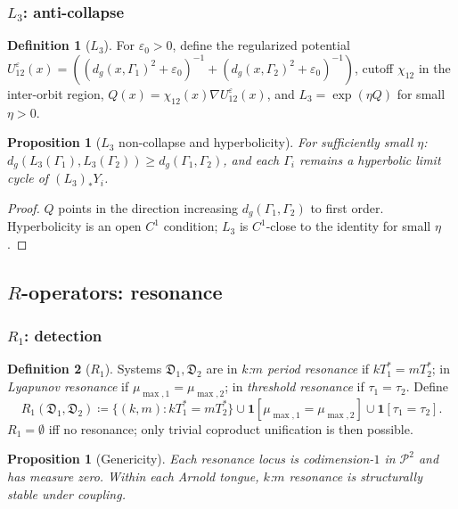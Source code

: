\documentclass[12pt, oneside]{book}
\theoremstyle{plain}
\newtheorem{proposition}[theorem]{Proposition}
\theoremstyle{definition}
\newtheorem{definition}{Definition}[section]
\theoremstyle{remark}
\newcommand{\dm}{\mathfrak{D}}
\newcommand{\Orb}{\Gamma}
\newcommand{\cP}{\mathcal{P}}
\newcommand{\eps}{\varepsilon}
\newcommand{\dg}{d_g}
\begin{document}
\subsubsection{\texorpdfstring{$L_3$}{L3}: anti-collapse}

\begin{definition}[$L_3$]\label{def:L3}
For $\eps_0>0$, define the regularized potential
$U_{12}^\eps(x)=((\dg(x,\Orb_1)^2+\eps_0)^{-1}+(\dg(x,\Orb_2)^2+\eps_0)^{-1})$,
cutoff $\chi_{12}$ in the inter-orbit region,
$Q(x)=\chi_{12}(x)\nabla U_{12}^\eps(x)$,
and $L_3=\exp(\eta Q)$ for small $\eta>0$.
\end{definition}

\begin{proposition}[$L_3$ non-collapse and hyperbolicity]\label{prop:L3}
For sufficiently small $\eta$:
$\dg(L_3(\Orb_1),L_3(\Orb_2))\ge\dg(\Orb_1,\Orb_2)$,
and each $\Orb_i$ remains a hyperbolic limit cycle of $(L_3)_*Y_i$.
\end{proposition}
\begin{proof}
$Q$ points in the direction increasing $\dg(\Orb_1,\Orb_2)$ to first
order. Hyperbolicity is an open $C^1$ condition; $L_3$ is $C^1$-close
to the identity for small $\eta$.
\end{proof}

\subsection{\texorpdfstring{$R$}{R}-operators: resonance}
\label{subsec:R}

\subsubsection{\texorpdfstring{$R_1$}{R1}: detection}

\begin{definition}[$R_1$]\label{def:R1}
Systems $\dm_1,\dm_2$ are in \emph{$k$:$m$ period resonance}
if $kT_1^*=mT_2^*$; in \emph{Lyapunov resonance} if
$\mu_{\max,1}=\mu_{\max,2}$; in \emph{threshold resonance} if
$\tau_1=\tau_2$. Define
\[
  R_1(\dm_1,\dm_2)\coloneqq
  \{(k,m):kT_1^*=mT_2^*\}\cup\mathbf{1}[\mu_{\max,1}=\mu_{\max,2}]
  \cup\mathbf{1}[\tau_1=\tau_2].
\]
$R_1=\emptyset$ iff no resonance; only trivial coproduct
unification is then possible.
\end{definition}

\begin{proposition}[Genericity]\label{prop:R1}
Each resonance locus is codimension-$1$ in $\cP^2$ and has measure
zero. Within each Arnold tongue, $k$:$m$ resonance is structurally
stable under coupling.
\end{proposition}
\end{document}
